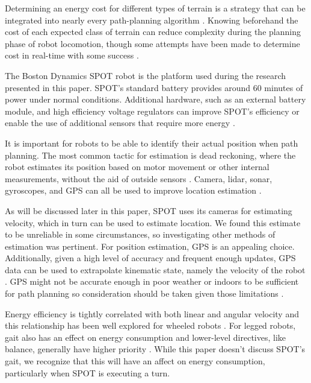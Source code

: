 \documentclass[conference]{IEEEtran}
\begin{document}
    Determining an energy cost for different types of terrain is a strategy that can be integrated into nearly every path-planning algorithm \cite{mousas2013minimum}. Knowing beforehand the cost of each expected class of terrain can reduce complexity during the planning phase of robot locomotion, though some attempts have been made to determine cost in real-time with some success \cite{howard2007optimal, plonski2013energy, iagnemma2004online}.
    
    The Boston Dynamics SPOT robot is the platform used during the research presented in this paper. SPOT's standard battery provides around 60 minutes of power under normal conditions. Additional hardware, such as an external battery module, and high efficiency voltage regulators can improve SPOT's efficiency or enable the use of additional sensors that require more energy \cite{bouman2020autonomous}.
    
    It is important for robots to be able to identify their actual position when path planning. The most common tactic for estimation is dead reckoning, where the robot estimates its position based on motor movement or other internal measurements, without the aid of outside sensors \cite{komoriya1994position}. Camera, lidar, sonar, gyroscopes, and GPS can all be used to improve location estimation \cite{8460940, drumheller1987mobile, westmore1991direct, komoriya1994position}.
    
    As will be discussed later in this paper, SPOT uses its cameras for estimating velocity, which in turn can be used to estimate location. We found this estimate to be unreliable in some circumstances, so investigating other methods of estimation was pertinent. For position estimation, GPS is an appealing choice. Additionally, given a high level of accuracy and frequent enough updates, GPS data can be used to extrapolate kinematic state, namely the velocity of the robot \cite{witte2005accuracy}. GPS might not be accurate enough in poor weather or indoors to be sufficient for path planning so consideration should be taken given those limitations \cite{8460940}.
    
    Energy efficiency is tightly correlated with both linear and angular velocity and this relationship has been well explored for wheeled robots \cite{mei2004energy, barili1995energy}. For legged robots, gait also has an effect on energy consumption and lower-level directives, like balance, generally have higher priority \cite{roy2012effects}. While this paper doesn't discuss SPOT's gait, we recognize that this will have an affect on energy consumption, particularly when SPOT is executing a turn.
\end{document}
